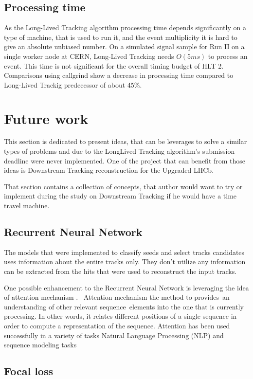 \subsection{Processing time}

As the Long-Lived Tracking algorithm processing time depends significantly on a type of machine, that is used to run it, and the event multiplicity it is hard to give an absolute unbiased number. On a simulated signal sample for Run II on a single worker node at CERN, Long-Lived Tracking needs $O(5 ms)$ to process an event. This time is not significant for the overall timing budget of HLT 2.
Comparisons using callgrind show a decrease in processing time compared to Long-Lived Trackig predecessor of about 45\%.

\section{Future work}
This section is dedicated to present ideas, that can be leverages to solve a similar types of problems and due to the LongLived Tracking algorithm's submission deadline were never implemented. One of the project that can benefit from those ideas is Downstream Tracking reconstruction for the Upgraded LHCb. 

That section contains a collection of concepts, that author would want to try or implement during the study on Downstream Tracking if he would have a time travel machine.

\subsection{Recurrent Neural Network}
The models that were implemented to classify seeds and select tracks candidates uses information about the entire tracks only. They don't utilize any information can be extracted from the hits that were used to reconstruct the input tracks.  



One possible enhancement to the Recurrent Neural Network is leveraging the idea of attention mechanism \cite{attention}.  Attention mechanism the method to provides an understanding of other relevant sequence elements into the one that is currently processing. In other words, it relates different positions of a single sequence in order to compute a representation of the sequence. Attention has been used successfully in a variety of tasks Natural Language Processing (NLP) and sequence modeling tasks

\subsection{Focal loss}
\label{sec:focal_loss}

